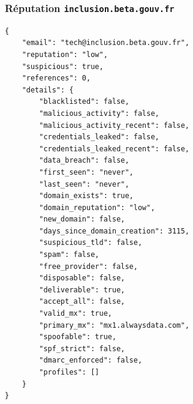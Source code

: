 \documentclass{beamer}
\begin{document}
\begin{frame}[fragile]
    \frametitle{Réputation \texttt{inclusion.beta.gouv.fr}}
    \vspace{-12pt}
    \begin{verbatim}
{
    "email": "tech@inclusion.beta.gouv.fr",
    "reputation": "low",
    "suspicious": true,
    "references": 0,
    "details": {
        "blacklisted": false,
        "malicious_activity": false,
        "malicious_activity_recent": false,
        "credentials_leaked": false,
        "credentials_leaked_recent": false,
        "data_breach": false,
        "first_seen": "never",
        "last_seen": "never",
        "domain_exists": true,
        "domain_reputation": "low",
        "new_domain": false,
        "days_since_domain_creation": 3115,
        "suspicious_tld": false,
        "spam": false,
        "free_provider": false,
        "disposable": false,
        "deliverable": true,
        "accept_all": false,
        "valid_mx": true,
        "primary_mx": "mx1.alwaysdata.com",
        "spoofable": true,
        "spf_strict": false,
        "dmarc_enforced": false,
        "profiles": []
    }
}
    \end{verbatim}
\end{frame}
\end{document}
